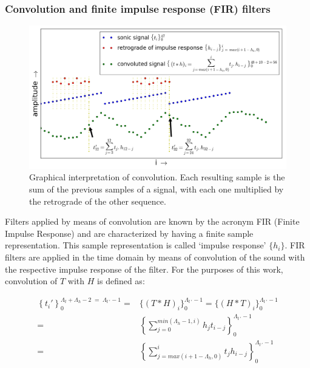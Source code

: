 \subsubsection{Convolution and finite impulse response (FIR) filters}\label{subsec:conv}
\begin{figure}
     \centering
         \includegraphics[width=\textwidth]{figures/convolucao_}
     \caption{Graphical interpretation of convolution. Each resulting sample is the sum of the previous samples of a signal, with each one multiplied by the retrograde of the other sequence.}
         \label{fig:conv}
\end{figure}

Filters applied by means of convolution are known by the acronym FIR (Finite Impulse Response) and are characterized by having a finite sample representation.
This sample representation is called `impulse response' $\{h_i\}$.
FIR filters are applied in the time domain by means of convolution of the sound with the respective impulse response of the filter.
For the purposes of this work, convolution of $T$ with $H$ is defined as:

\begin{equation}\label{eq:conv}
 \begin{split}
 \left\{t_i'\right\}_0^{\Lambda_t+\Lambda_h-2\; = \;\Lambda_{t\, '}-1} = & \{(T*H)_i\}_0^{\Lambda_{t \, '}-1} = \{(H*T)_i\}_0^{\Lambda_{t \, '}-1} \\
     = & \left \{ \sum_{j=0}^{min(\Lambda_h-1,i)}h_{j} t_{i-j} \right \}_0^{\Lambda_{t\, '}-1} 
     \\ = & \left \{ \sum_{j=max(i+1-\Lambda_h,0)}^{i}t_j h_{i-j} \right \}_0^{\Lambda_{t\, '}-1}
 \end{split}
\end{equation}

